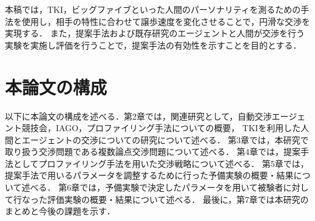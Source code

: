 本稿では，TKI，ビッグファイブといった人間のパーソナリティを測るための手法を使用し，相手の特性に合わせて譲歩速度を変化させることで，円滑な交渉を実現する．
また，提案手法および既存研究のエージェントと人間が交渉を行う実験を実施し評価を行うことで，提案手法の有効性を示すことを目的とする．

\section{本論文の構成}
以下に本論文の構成を述べる．第2章では，関連研究として，自動交渉エージェント競技会，IAGO，プロファイリング手法についての概要，
TKIを利用した人間とエージェントの交渉についての研究について述べる．
第3章では，本研究で取り扱う交渉問題である複数論点交渉問題について述べる．
第4章では，提案手法としてプロファイリング手法を用いた交渉戦略について述べる．
第5章では，提案手法で用いるパラメータを調整するために行った予備実験の概要・結果について述べる．
第6章では，予備実験で決定したパラメータを用いて被験者に対して行なった評価実験の概要・結果について述べる．
最後に，第7章では本研究のまとめと今後の課題を示す．

